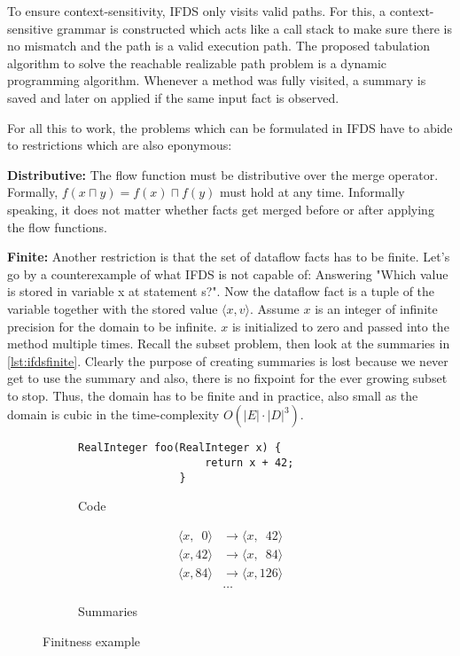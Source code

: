 \documentclass[../draft.tex]{subfiles}
\begin{document}
    To ensure context-sensitivity, IFDS only visits valid paths. For this, a context-sensitive grammar is constructed which acts like a call stack to make sure there is no mismatch and the path is a valid execution path.
    The proposed tabulation algorithm to solve the reachable realizable path problem is a dynamic programming algorithm. Whenever a method was fully visited, a summary is saved and later on applied if the same input fact is observed. 

    For all this to work, the problems which can be formulated in IFDS have to abide to restrictions which are also eponymous:

    \textbf{Distributive:} The flow function must be distributive over the merge operator. Formally, $f(x \sqcap y) = f(x) \sqcap f(y)$ must hold at any time. Informally speaking, it does not matter whether facts get merged before or after applying the flow functions.

    \textbf{Finite:} Another restriction is that the set of dataflow facts has to be finite. Let's go by a counterexample of what IFDS is not capable of: Answering "Which value is stored in variable x at statement s?".
    Now the dataflow fact is a tuple of the variable together with the stored value $\langle x, v \rangle$. Assume $x$ is an integer of infinite precision for the domain to be infinite.
    $x$ is initialized to zero and passed into the method  multiple times. Recall the subset problem, then look at the summaries in \autoref{lst:ifdsfinite}. Clearly the purpose of creating summaries is lost because we never get to use the summary and also, there is no fixpoint for the ever growing subset to stop. Thus, the domain has to be finite and in practice, also small as the domain is cubic in the time-complexity $O(|E| \cdot |D|^3)$.
    \begin{figure}[ht]
        \centering
        \begin{subfigure}[b]{0.45\textwidth}
            \begin{lstlisting}[gobble=16]
                RealInteger foo(RealInteger x) {
                    return x + 42;
                }
            \end{lstlisting}
            \caption{Code}
        \end{subfigure}
        \begin{subfigure}[b]{0.45\textwidth}
            $$
                \begin{aligned}
                    \langle x, \phantom{0}0 \rangle &\rightarrow \langle x, \phantom{1}42 \rangle\\
                    \langle x, 42 \rangle &\rightarrow \langle x, \phantom{1}84 \rangle\\
                    \langle x, 84 \rangle &\rightarrow \langle x, 126 \rangle\\
                    &\dots
                \end{aligned}
            $$
            \caption{Summaries}
        \end{subfigure}
        \caption{Finitness example}
        \label{lst:ifdsfinite}
    \end{figure}
\end{document}
